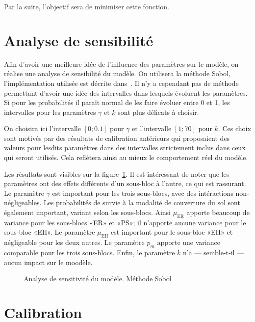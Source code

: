 \documentclass[a4paper, 11pt]{article}
\begin{document}
Par la suite, l'objectif sera de minimiser cette fonction.


\section{Analyse de sensibilité}

Afin d'avoir une meilleure idée  de l'influence des paramètres sur le modèle, on réalise une analyse de sensibilité du modèle. On utilisera la méthode Sobol, l'implémentation utilisée est décrite dans~\cite{sa}. Il n'y a cependant pas de méthode permettant d'avoir une idée des intervalles dans lesquels évoluent les paramètres. 
Si pour les probabilités il paraît normal de les faire évoluer entre 0 et 1, les intervalles pour les paramètres $\gamma$ et $k$ sont plus délicats à choisir.

On choisira ici l'intervalle $[0;0.1]$ pour $\gamma$ et l'intervalle $[1; 70]$ pour $k$. Ces choix sont motivés par des résultats de calibration antérieurs qui proposaient des valeurs pour lesdits paramètres dans des intervalles strictement inclus dans ceux qui seront utilisés. Cela reflètera ainsi au mieux le comportement réel du modèle.

Les résultats sont visibles sur la figure~\ref{fig:sa}. Il est intéressant de noter que les paramètres ont des effets différents d'un sous-bloc à l'autre, ce qui est rassurant. Le paramètre $\gamma$ est important pour les trois sous-blocs, avec des intéractions non-négligeables. Les probabilités de survie à la modalité de couverture du sol sont également important, variant selon les sous-blocs. Ainsi $\mu_{\text{ER}}$ apporte beaucoup de variance pour les sous-blocs «ER» et «PS»; il n'apporte aucune variance pour le sous-bloc «EH». Le paramètre $\mu_{\text{EH}}$ est important pour le sous-bloc «EH» et négligeable pour les deux autres. Le paramètre $p_m$ apporte une variance comparable pour les trois sous-blocs. Enfin, le paramètre $k$ n'a --- semble-t-il --- aucun impact sur le moodèle.


\begin{figure}[ht]
 \centering
 \caption{Analyse de sensitivité du modèle. Méthode Sobol}
 \label{fig:sa}
\end{figure}


\section{Calibration}
\end{document}
